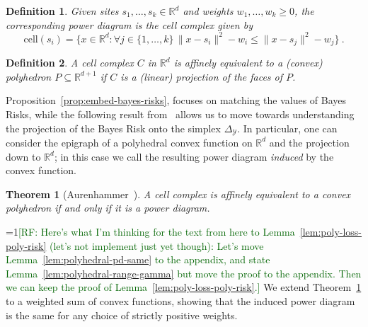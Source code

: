 \documentclass[11pt]{article}
\newcommand{\Comments}{1}
\newcommand{\mynote}[2]{\ifnum\Comments=1\textcolor{#1}{#2}\fi}
\newcommand{\raf}[1]{\mynote{darkgreen}{[RF: #1]}}
\newcommand{\reals}{\mathbb{R}}
\newcommand{\cell}{\mathrm{cell}}
\newcommand{\simplex}{\Delta_\Y}
\newcommand{\Y}{\mathcal{Y}}
\newtheorem{theorem}{Theorem}
\newtheorem{definition}{Definition}
\begin{document}
\begin{definition}\label{def:power-diagram}
  Given sites $s_1,\ldots,s_k\in\reals^d$ and weights $w_1,\ldots,w_k \geq 0$, the corresponding \emph{power diagram} is the cell complex given by
  \begin{equation}
    \label{eq:pd}
    \cell(s_i) = \{ x \in\reals^d : \forall j \in \{1,\ldots,k\} \, \|x - s_i\|^2 - w_i \leq \|x - s_j\|^2 - w_j\}~.
  \end{equation}
\end{definition}

\begin{definition}\label{def:affine-equiv}
  A cell complex $C$ in $\reals^d$ is \emph{affinely equivalent} to a (convex) polyhedron $P \subseteq \reals^{d+1}$ if $C$ is a (linear) projection of the faces of $P$.
\end{definition}

Proposition~\ref{prop:embed-bayes-risks}, focuses on matching the values of Bayes Risks, while the following result from~\citet{aurenhammer1987power} allows us to move towards understanding the projection of the Bayes Risk onto the simplex $\simplex$.
In particular, one can consider the epigraph of a polyhedral convex function on $\reals^d$ and the projection down to $\reals^d$; in this case we call the resulting power diagram \emph{induced} by the convex function.

\begin{theorem}[Aurenhammer~\cite{aurenhammer1987power}]\label{thm:aurenhammer}
	A cell complex is affinely equivalent to a convex polyhedron if and only if it is a power diagram.
\end{theorem}

\raf{Here's what I'm thinking for the text from here to Lemma~\ref{lem:poly-loss-poly-risk} (let's not implement just yet though): Let's move Lemma~\ref{lem:polyhedral-pd-same} to the appendix, and state Lemma~\ref{lem:polyhedral-range-gamma} but move the proof to the appendix.  Then we can keep the proof of Lemma~\ref{lem:poly-loss-poly-risk}.}
We extend Theorem~\ref{thm:aurenhammer} to a weighted sum of convex functions, showing that the induced power diagram is the same for any choice of strictly positive weights.
\end{document}
